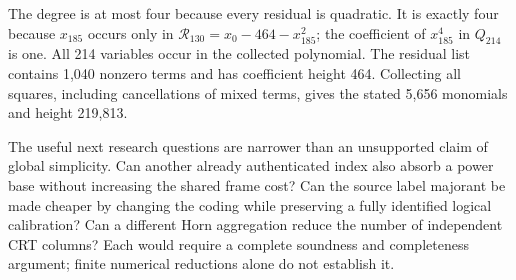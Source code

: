 \documentclass[11pt,a4paper]{article}
\theoremstyle{definition}
\newcommand{\R}{\mathcal R}
\newcommand{\Qdiag}{Q_{214}}
\begin{document}
The degree is at most four because every residual is quadratic. It is
exactly four because $x_{185}$ occurs only in
$\R_{130}=x_0-464-x_{185}^2$; the coefficient of $x_{185}^4$ in
$\Qdiag$ is one. All 214 variables occur in the collected polynomial.
The residual list contains 1,040 nonzero terms and has coefficient
height 464. Collecting all squares, including cancellations of mixed
terms, gives the stated 5,656 monomials and height 219,813.

The useful next research questions are narrower than an unsupported
claim of global simplicity. Can another already authenticated index
also absorb a power base without increasing the shared frame cost?
Can the source label majorant be made cheaper by changing the coding
while preserving a fully identified logical calibration? Can a
different Horn aggregation reduce the number of independent CRT
columns? Each would require a complete soundness and completeness
argument; finite numerical reductions alone do not establish it.
\end{document}

